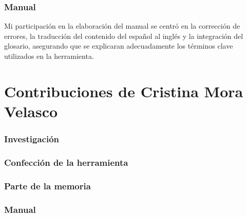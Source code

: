 \subsubsection*{Manual}
Mi participación en la elaboración del manual se centró en la corrección de errores, la traducción del contenido del español al inglés y la integración del glosario, asegurando que se explicaran adecuadamente los términos clave utilizados en la herramienta.\\

\section*{Contribuciones de Cristina Mora Velasco}
\subsubsection*{Investigación}
\subsubsection*{Confección de la herramienta}
\subsubsection*{Parte de la memoria}
\subsubsection*{Manual}


